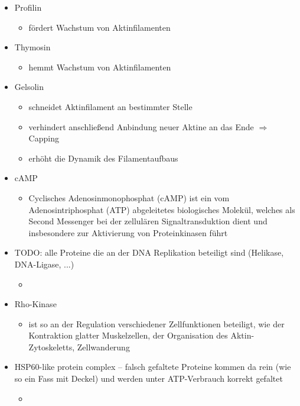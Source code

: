 \documentclass{article}
\begin{document}
\begin{itemize}
    \item Profilin
        \begin{itemize}
            \item fördert Wachstum von Aktinfilamenten
        \end{itemize}        
        
    \item Thymosin
        \begin{itemize}
            \item hemmt Wachstum von Aktinfilamenten
        \end{itemize}        

    \item Gelsolin
        \begin{itemize}
            \item schneidet Aktinfilament an bestimmter Stelle
            \item verhindert anschließend Anbindung neuer Aktine an das Ende $\Rightarrow$ Capping
            \item erhöht die Dynamik des Filamentaufbaus
        \end{itemize}
        
    \item cAMP
        \begin{itemize}
            \item Cyclisches Adenosinmonophosphat (cAMP) ist ein vom Adenosintriphosphat (ATP) abgeleitetes biologisches Molekül, welches als Second Messenger bei der zellulären Signaltransduktion dient und insbesondere zur Aktivierung von Proteinkinasen führt
        \end{itemize}
        
    \item TODO: alle Proteine die an der DNA Replikation beteiligt sind (Helikase, DNA-Ligase, ...)
        \begin{itemize}
            \item 
        \end{itemize}
        
    \item Rho-Kinase
        \begin{itemize}
            \item ist so an der Regulation verschiedener Zellfunktionen beteiligt, wie der Kontraktion glatter Muskelzellen, der Organisation des Aktin-Zytoskeletts, Zellwanderung
        \end{itemize}  
        
    \item HSP60-like protein complex -- falsch gefaltete Proteine kommen da rein (wie so ein Fass mit Deckel) und werden unter ATP-Verbrauch korrekt gefaltet
        \begin{itemize}
            \item 
        \end{itemize}  
        
\end{itemize}
\end{document}
